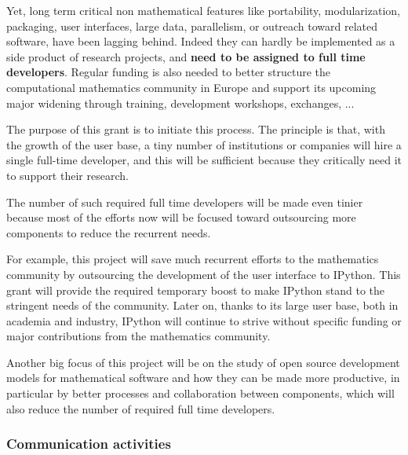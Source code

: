 \documentclass[a4paper,11pt]{article}
\begin{document}

Yet, long term critical non mathematical features like portability,
modularization, packaging, user interfaces, large data, parallelism,
or outreach toward related software, have been lagging behind. Indeed
they can hardly be implemented as a side product of research projects,
and \textbf{need to be assigned to full time developers}. Regular
funding is also needed to better structure the computational
mathematics community in Europe and support its upcoming major
widening through training, development workshops, exchanges, ...

The purpose of this grant is to initiate this process. The principle
is that, with the growth of the user base, a tiny number of
institutions or companies will hire a single full-time developer, and
this will be sufficient because they critically need it to support
their research.

The number of such required full time developers will be made even
tinier because most of the efforts now will be focused toward
outsourcing more components to reduce the recurrent needs.

For example, this project will save much recurrent efforts to the
mathematics community by outsourcing the development of the user
interface to IPython. This grant will provide the required temporary
boost to make IPython stand to the stringent needs of the community.
Later on, thanks to its large user base, both in academia and
industry, IPython will continue to strive without specific funding or
major contributions from the mathematics community.

Another big focus of this project will be on the study of open source
development models for mathematical software and how they can be made
more productive, in particular by better processes and collaboration
between components, which will also reduce the number of required full
time developers.

\draftpage

\subsubsection{Communication activities}
\label{subsubsect:communication}

\end{document}
